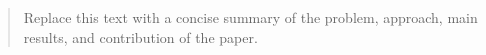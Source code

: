 \begin{abstract}
Replace this text with a concise summary of the problem, approach, main results, and contribution of the paper.
\end{abstract}


